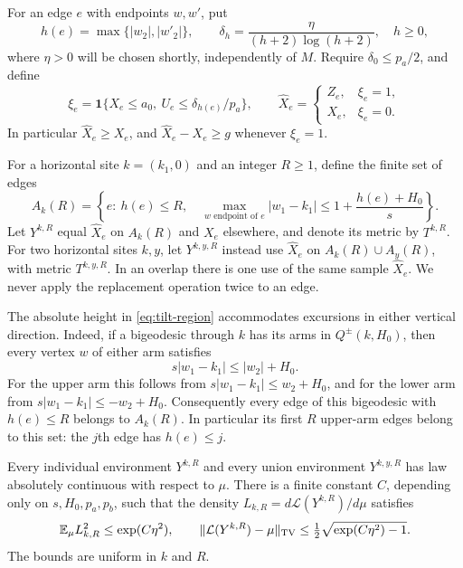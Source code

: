 For an edge $e$ with endpoints $w,w'$, put
\[
 h(e)=\max\{|w_2|,|w'_2|\},\qquad
 \delta_h=\frac{\eta}{(h+2)\log(h+2)},\quad h\geq0,
\]
where $\eta>0$ will be chosen shortly, independently of $M$.  Require
$\delta_0\leq p_a/2$, and define
\begin{equation}\label{eq:shared-raise}
 \xi_e=\mathbf1\{X_e\leq a_0,\ U_e\leq\delta_{h(e)}/p_a\},
 \qquad
 \widehat X_e=
 \begin{cases}
 Z_e,&\xi_e=1,\\
 X_e,&\xi_e=0.
 \end{cases}
\end{equation}
In particular $\widehat X_e\geq X_e$, and
$\widehat X_e-X_e\geq g$ whenever $\xi_e=1$.

For a horizontal site $k=(k_1,0)$ and an integer $R\geq1$, define the
finite set of edges
\begin{equation}\label{eq:tilt-region}
 A_k(R)=\left\{e:\ h(e)\leq R,\quad
  \max_{w\text{ endpoint of }e}|w_1-k_1|
       \leq1+\frac{h(e)+H_0}{s}\right\}.
\end{equation}
Let $Y^{k,R}$ equal $\widehat X_e$ on $A_k(R)$ and $X_e$ elsewhere,
and denote its metric by $T^{k,R}$.  For two horizontal sites $k,y$,
let $Y^{k,y,R}$ instead use $\widehat X_e$ on
$A_k(R)\cup A_y(R)$, with metric $T^{k,y,R}$.  In an overlap there is
one use of the same sample $\widehat X_e$.  We never apply the replacement
operation twice to an edge.

The absolute height in \eqref{eq:tilt-region} accommodates excursions in
either vertical direction.  Indeed, if a bigeodesic through $k$ has its
arms in $Q^\pm(k,H_0)$, then every vertex $w$ of either arm satisfies
\begin{equation}\label{eq:whole-path-width}
 s|w_1-k_1|\leq |w_2|+H_0.
\end{equation}
For the upper arm this follows from
$s|w_1-k_1|\leq w_2+H_0$, and for the lower arm from
$s|w_1-k_1|\leq-w_2+H_0$.  Consequently every edge of this bigeodesic
with $h(e)\leq R$ belongs to $A_k(R)$.  In particular its first $R$
upper-arm edges belong to this set: the $j$th edge has $h(e)\leq j$.

\begin{lemma}\label{lem:likelihood}
Every individual environment $Y^{k,R}$ and every union environment
$Y^{k,y,R}$ has law absolutely continuous with respect to $\mu$.
There is a finite constant $C$, depending only on $s,H_0,p_a,p_b$, such
that the density $L_{k,R}=d\mathcal L(Y^{k,R})/d\mu$ satisfies
\begin{equation}\label{eq:likelihood-bound}
 \mathbb E_\mu L_{k,R}^2\leq\exp(C\eta^2),\qquad
 \|\mathcal L(Y^{k,R})-\mu\|_{\mathrm{TV}}
 \leq\tfrac12\sqrt{\exp(C\eta^2)-1}.
\end{equation}
The bounds are uniform in $k$ and $R$.
\end{lemma}

